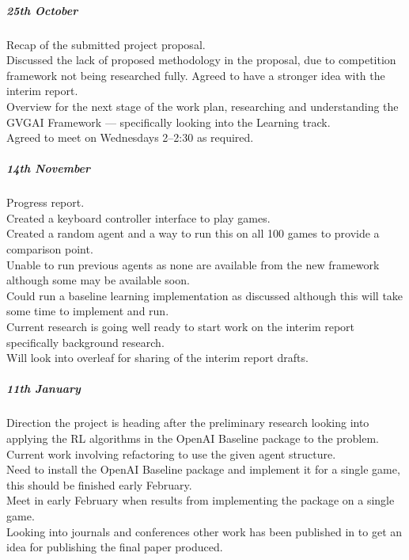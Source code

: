 \documentclass[a4paper]{article}
\begin{document}
\subparagraph{25th October}
Recap of the submitted project proposal. \\
Discussed the lack of proposed methodology in the proposal, due to competition framework not being researched fully. Agreed to have a stronger idea with the interim report. \\
Overview for the next stage of the work plan, researching and understanding the GVGAI Framework --- specifically looking into the Learning track. \\
Agreed to meet on Wednesdays 2--2:30 as required.

\subparagraph{14th November}
Progress report. \\
Created a keyboard controller interface to play games. \\
Created a random agent and a way to run this on all 100 games to provide a comparison point. \\
Unable to run previous agents as none are available from the new framework although some may be available soon. \\
Could run a baseline learning implementation as discussed although this will take some time to implement and run. \\
Current research is going well ready to start work on the interim report specifically background research. \\
Will look into overleaf for sharing of the interim report drafts.

\subparagraph{11th January}
Direction the project is heading after the preliminary research looking into applying the RL algorithms in the OpenAI Baseline package to the problem. \\
Current work involving refactoring to use the given agent structure. \\
Need to install the OpenAI Baseline package and implement it for a single game, this should be finished early February. \\
Meet in early February when results from implementing the package on a single game. \\
Looking into journals and conferences other work has been published in to get an idea for publishing the final paper produced. \\
\end{document}

